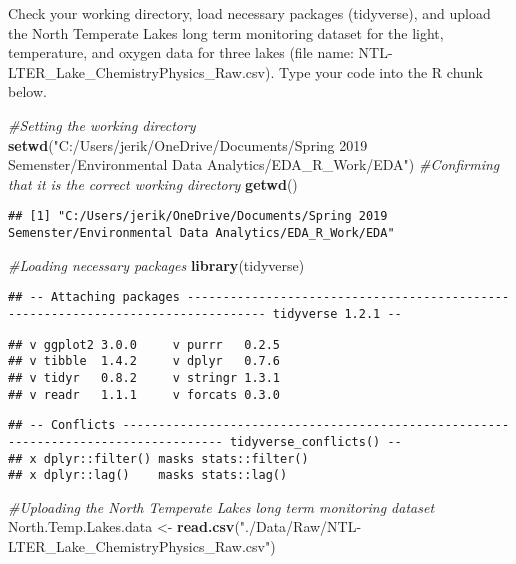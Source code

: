 \documentclass[]{article}
\newenvironment{Shaded}{\begin{snugshade}}{\end{snugshade}}
\newcommand{\KeywordTok}[1]{\textcolor[rgb]{0.13,0.29,0.53}{\textbf{#1}}}
\newcommand{\StringTok}[1]{\textcolor[rgb]{0.31,0.60,0.02}{#1}}
\newcommand{\CommentTok}[1]{\textcolor[rgb]{0.56,0.35,0.01}{\textit{#1}}}
\newcommand{\NormalTok}[1]{#1}
\begin{document}
Check your working directory, load necessary packages (tidyverse), and
upload the North Temperate Lakes long term monitoring dataset for the
light, temperature, and oxygen data for three lakes (file name:
NTL-LTER\_Lake\_ChemistryPhysics\_Raw.csv). Type your code into the R
chunk below.

\begin{Shaded}
\begin{Highlighting}[]
\CommentTok{#Setting the working directory}
\KeywordTok{setwd}\NormalTok{(}\StringTok{"C:/Users/jerik/OneDrive/Documents/Spring 2019 Semenster/Environmental Data Analytics/EDA_R_Work/EDA"}\NormalTok{)}
\CommentTok{#Confirming that it is the correct working directory}
\KeywordTok{getwd}\NormalTok{()}
\end{Highlighting}
\end{Shaded}

\begin{verbatim}
## [1] "C:/Users/jerik/OneDrive/Documents/Spring 2019 Semenster/Environmental Data Analytics/EDA_R_Work/EDA"
\end{verbatim}

\begin{Shaded}
\begin{Highlighting}[]
\CommentTok{#Loading necessary packages}
\KeywordTok{library}\NormalTok{(tidyverse)}
\end{Highlighting}
\end{Shaded}

\begin{verbatim}
## -- Attaching packages --------------------------------------------------------------------------------- tidyverse 1.2.1 --
\end{verbatim}

\begin{verbatim}
## v ggplot2 3.0.0     v purrr   0.2.5
## v tibble  1.4.2     v dplyr   0.7.6
## v tidyr   0.8.2     v stringr 1.3.1
## v readr   1.1.1     v forcats 0.3.0
\end{verbatim}

\begin{verbatim}
## -- Conflicts ------------------------------------------------------------------------------------ tidyverse_conflicts() --
## x dplyr::filter() masks stats::filter()
## x dplyr::lag()    masks stats::lag()
\end{verbatim}

\begin{Shaded}
\begin{Highlighting}[]
\CommentTok{#Uploading the North Temperate Lakes long term monitoring dataset}
\NormalTok{North.Temp.Lakes.data <-}\StringTok{ }\KeywordTok{read.csv}\NormalTok{(}\StringTok{"./Data/Raw/NTL-LTER_Lake_ChemistryPhysics_Raw.csv"}\NormalTok{)}
\end{Highlighting}
\end{Shaded}
\end{document}
